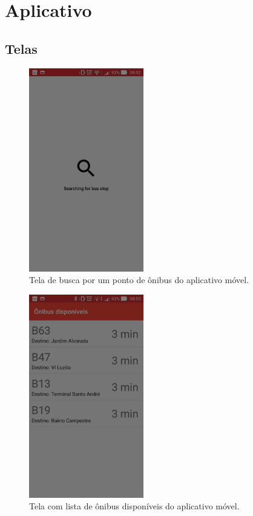 \documentclass[
	12pt,				%
	oneside,			%
	a4paper,			%
	brazil				%
]{abntex2}
\begin{document}
\newpage

\section{Aplicativo}

\subsection{Telas}

\begin{figure}[h]
\centering
\includegraphics[width=5cm, center]{images/beacon_searching_bus_stop}
\caption{Tela de busca por um ponto de ônibus do aplicativo móvel.}
\label{Rotulo}
\end{figure}

\begin{figure}[h]
\centering
\includegraphics[width=5cm, center]{images/beacon_list_bus}
\caption{Tela com lista de ônibus disponíveis do aplicativo móvel.}
\label{Rotulo}
\end{figure}
\end{document}
